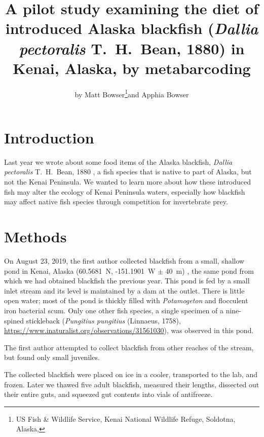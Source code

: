 \title{A pilot study examining the diet of introduced Alaska blackfish (\textit{Dallia pectoralis} T.\ H.\ Bean, 1880) in Kenai, Alaska, by metabarcoding}

\subtitle{}

\author{by Matt Bowser\footnote{US Fish \& Wildlife Service, Kenai National Wildlife Refuge, Soldotna, Alaska, }and Apphia Bowser}

\maketitle

\section{Introduction}

Last year we  wrote about some food items of the Alaska blackfish, \textit{Dallia pectoralis} T.\ H.\ Bean, 1880 \citep{Bowseretal2019},  a fish species that is native to part of Alaska, but not the Kenai Peninsula. We wanted to learn more about how these introduced fish may alter the ecology of Kenai Peninsula waters, especially how blackfish may affect native fish species through competition for invertebrate prey.

\section{Methods}

On August 23, 2019, the first author collected blackfish from a small, shallow pond in Kenai, Alaska (60.5681~\textdegree{}N, -151.1901~\textdegree{}W $\pm$ 40~m) \citep{bowser2019}, the same pond from which we had obtained blackfish the previous year. This pond is fed by a small inlet stream and its level is maintained by a dam at the outlet. There is little open water; most of the pond is thickly filled with \textit{Potamogeton} and flocculent iron bacterial scum. Only one other fish species, a single specimen of a nine-spined stickleback (\textit{Pungitius pungitius} (Linnaeus, 1758),  
\url{https://www.inaturalist.org/observations/31561030}), was observed in this pond.

The first author attempted to collect blackfish from other reaches of the stream, but found only small juveniles. 

The collected blackfish were placed on ice in a cooler, transported to the lab, and frozen. Later we thawed five adult blackfish, measured their lengths, dissected out their entire guts, and squeezed gut contents into vials of  antifreeze.%

